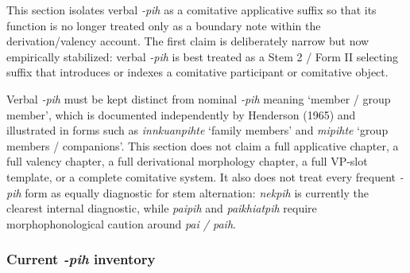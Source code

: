 \documentclass[
  11pt,
  a4paper,
]{article}
\newcommand{\tdim}[1]{\textit{#1}}
\newcommand{\glossquote}[1]{`#1'}
\begin{document}
This section isolates verbal \tdim{-pih} as a comitative applicative
suffix so that its function is no longer treated only as a boundary note
within the derivation/valency account. The first claim is deliberately
narrow but now empirically stabilized: verbal \tdim{-pih} is best
treated as a Stem 2 / Form II selecting suffix that introduces or
indexes a comitative participant or comitative object.

Verbal \tdim{-pih} must be kept distinct from nominal \tdim{-pih}
meaning \glossquote{member / group member}, which is documented
independently by Henderson (1965) and illustrated in forms such as
\tdim{innkuanpihte} \glossquote{family members} and \tdim{mipihte}
\glossquote{group members / companions}. This section does not claim a
full applicative chapter, a full valency chapter, a full derivational
morphology chapter, a full VP-slot template, or a complete comitative
system. It also does not treat every frequent \tdim{-pih} form as
equally diagnostic for stem alternation: \tdim{nekpih} is currently the
clearest internal diagnostic, while \tdim{paipih} and \tdim{paikhiatpih}
require morphophonological caution around \tdim{pai / paih}.

\subsubsection{\texorpdfstring{Current \tdim{-pih}
inventory}{Current  inventory}}\label{current-inventory-1}
\end{document}
